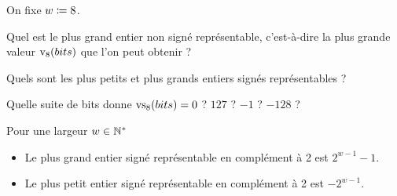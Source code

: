 \documentclass{magnolia}
\begin{document}
\begin{exoUnique}
  \exo
  On fixe $w \coloneqq 8$.
  \begin{questions}
    \item Quel est le plus grand entier non signé représentable, c'est-à-dire
          la plus grande valeur ${\rm v}_{8}(bits)$ que l'on peut obtenir ?
    \item Quels sont les plus petits et plus grands entiers signés
          représentables ?
    \item Quelle suite de bits donne ${\rm vs}_{8}(bits) = 0$ ? $127$ ?
          $-1$ ? $-128$ ?
  \end{questions}
\end{exoUnique}

\begin{proposition}
  Pour une largeur $w\in{\mathbb{N}^*}$
  \begin{itemize}
    \item Le plus grand entier signé représentable en complément à 2 est
          $2^{w - 1} - 1$.
    \item Le plus petit entier signé représentable en complément à 2 est
          $-2^{w - 1}$.
  \end{itemize}
\end{proposition}
\end{document}
